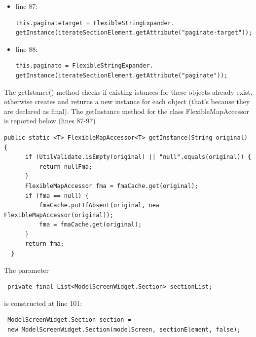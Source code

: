 \documentclass{article}
\begin{document}
\begin{flushleft}
\begin{itemize}
\item line 87:\\
\vspace{0.5cm}
\begin{lstlisting}  
this.paginateTarget = FlexibleStringExpander.
getInstance(iterateSectionElement.getAttribute("paginate-target")); 
\end{lstlisting}
\vspace{0.5cm}

\item line 88:\\
\vspace{0.5cm}
\begin{lstlisting}  
this.paginate = FlexibleStringExpander.
getInstance(iterateSectionElement.getAttribute("paginate"));
\end{lstlisting}
\end{itemize}
\vspace{0.5cm}


The getIstance() method checks if existing istances for these objects already exist, otherwise creates and returns a new instance for each object (that's because they are declared as final). 
The getInstance method for the class FlexibleMapAccessor is reported below (lines 87-97)\\
\vspace{0.5cm}

\begin{lstlisting} 
public static <T> FlexibleMapAccessor<T> getInstance(String original) {
      if (UtilValidate.isEmpty(original) || "null".equals(original)) {
          return nullFma;
      }
      FlexibleMapAccessor fma = fmaCache.get(original);
      if (fma == null) {
          fmaCache.putIfAbsent(original, new FlexibleMapAccessor(original));
          fma = fmaCache.get(original);
      }
      return fma;
  }
\end{lstlisting}
\vspace{0.5cm}

The  parameter \\
\vspace{0.5cm}
\begin{lstlisting}
 private final List<ModelScreenWidget.Section> sectionList;
 \end{lstlisting}
\vspace{0.5cm}
 
 is constructed at line 101:\\
 \vspace{0.5cm}
 \begin{lstlisting}
 ModelScreenWidget.Section section = 
 new ModelScreenWidget.Section(modelScreen, sectionElement, false);
 \end{lstlisting}
 \vspace{0.5cm}
 

\end{flushleft}
\end{document}
